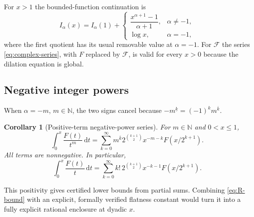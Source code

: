 \documentclass[11pt,oneside]{article}
\numberwithin{equation}{section}
\newtheorem{corollary}[theorem]{Corollary}
\theoremstyle{definition}
\theoremstyle{remark}
\newcommand{\N}{\mathbb N}
\newcommand{\dd}{\,\mathrm d}
\newcommand{\fall}[2]{#1^{\underline{#2}}}
\newcommand{\rise}[2]{#1^{\overline{#2}}}
\begin{document}
For $x>1$ the bounded-function continuation is
\begin{equation}
 I_\alpha(x)=I_\alpha(1)+
 \begin{cases}
 \dfrac{x^{\alpha+1}-1}{\alpha+1},&\alpha\ne-1,\\[6pt]
 \log x,&\alpha=-1,
 \end{cases}                                               \label{eq:Ialpha-outside}
\end{equation}
where the first quotient has its usual removable value at $\alpha=-1$.  For
$\mathcal F$ the series \eqref{eq:complex-series}, with $F$ replaced by
$\mathcal F$, is valid for every $x>0$ because the dilation equation is global.

\subsection{Negative integer powers}
When $\alpha=-m$, $m\in\N$, the two signs cancel because
$\fall{-m}{k}=(-1)^k\rise{m}{k}$.

\begin{corollary}[Positive-term negative-power series]
\label{cor:negative-series}
For $m\in\N$ and $0<x\le1$,
\begin{equation}
 \boxed{
 \int_0^x\frac{F(t)}{t^m}\dd t
 =\sum_{k=0}^{\infty}\rise{m}{k}
 2^{\binom{k+1}{2}}x^{-m-k}F(x/2^{k+1}).}                 \label{eq:negative-series}
\end{equation}
All terms are nonnegative.  In particular,
\begin{equation}
 \int_0^x\frac{F(t)}t\dd t
 =\sum_{k=0}^{\infty}k!\,2^{\binom{k+1}{2}}
 x^{-k-1}F(x/2^{k+1}).                                    \label{eq:negative-one-series}
\end{equation}
\end{corollary}

This positivity gives certified lower bounds from partial sums.  Combining
\eqref{eq:R-bound} with an explicit, formally verified flatness constant
would turn it into a fully explicit rational enclosure at dyadic $x$.
\end{document}

